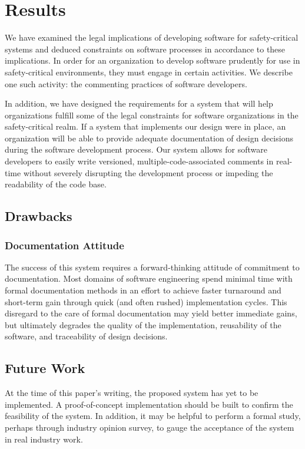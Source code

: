 \section{Results}\label{results}
We have examined the legal implications of developing software for
safety-critical systems and deduced constraints on software processes in
accordance to these implications. In order for an organization to develop 
software prudently for use in safety-critical environments, they must engage in
certain activities. We describe one such activity: the commenting practices of
software developers.

In addition, we have designed the requirements for a system that will help
organizations fulfill some of the legal constraints for software organizations
in the safety-critical realm. If a system that implements our design were in
place, an organization will be able to provide adequate documentation of design
decisions during the software development process. Our system allows for 
software developers to easily write versioned, multiple-code-associated comments
in real-time without severely disrupting the  development process or impeding
the readability of the code base.

\subsection{Drawbacks}

\subsubsection*{Documentation Attitude}
The success of this system requires a forward-thinking attitude of commitment to
documentation. Most domains of software engineering spend minimal time with
formal documentation methods in an effort to achieve faster turnaround and
short-term gain through quick (and often rushed) implementation cycles. This
disregard to the care of formal documentation may yield better immediate gains,
but ultimately degrades the quality of the implementation, reusability of the
software,  and traceability of design decisions.

\subsection{Future Work}
At the time of this paper's writing, the proposed system has yet to be
implemented. A proof-of-concept implementation should be built to confirm the
feasibility of the system. In addition, it may be helpful to perform a formal
study, perhaps through industry opinion survey, to gauge the acceptance of the
system in real industry work.

